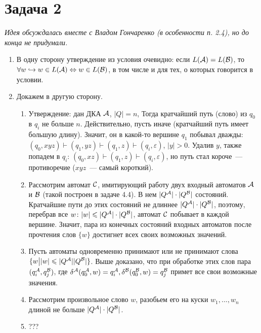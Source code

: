 \documentclass[a4paper]{article}
\def\A{{\cal A}}
\def\B{{\cal B}}
\def\C{{\cal C}}
\begin{document}
\section*{Задача 2}
{\em{Идея обсуждалась вместе с Владом Гончаренко (в особенности п. 2.4), но до конца не придумали.}}
\begin{enumerate}[1.]
\item В одну сторону утверждение из условия очевидно: если $L(\A)=L(\B)$, то $\forall w\hookrightarrow w\in L(\A)\Leftrightarrow w\in L(\B)$, в том числе и для тех, о которых говорится в условии.
\item Докажем в другую сторону.\begin{enumerate}[1.]
\item Утверждение: дан ДКА $\A$, $|Q|=n$, Тогда кратчайший путь (слово) из $q_0$ в $q_i$ не больше $n$. Действительно, пусть иначе (кратчайший путь имеет большую длину). Значит, он в какой-то вершине $q_1$ побывал дважды: $(q_0,xyz)\vdash(q_1,yz)\vdash(q_1,z)\vdash(q_i,\varepsilon)$, $|y|>0$. Удалив $y$, также попадем в $q_i$: $(q_0,xz)\vdash(q_1,z)\vdash(q_i,\varepsilon)$, но путь стал короче~--- противоречие ($xyz$~--- самый короткий).
\item Рассмотрим автомат $\C$, имитирующий работу двух входный автоматов $\A$ и $\B$ (такой построен в задаче 4.4). В нем $|Q^\A| \cdot |Q^\B|$ состояний. Кратчайшие пути до этих состояний не длиннее $|Q^\A| \cdot |Q^\B|$, поэтому, перебрав все $w\colon |w|\leqslant |Q^\A| \cdot |Q^\B|$, автомат $\C$ побывает в каждой вершине. Значит, пара из конечных состояний входных автоматов после прочтения слов $\{w\}$ достигнет всех своих возможных значений.
\item Пусть автоматы одновременно принимают или не принимают слова $\{w\big||w|\leqslant|Q^\A||Q^\B|\}$. Выше доказано, что при обработке этих слов пара $(q^\A_i,q^\B_j)$, где $\delta^\A(q^\A_0,w)=q^\A_i,\delta^\B(q^\B_0,w)=q^\B_j$ примет все свои возможные значения.
\item Рассмотрим произвольное слово $w$, разобьем его на куски $w_1,...,w_n$ длиной не больше $|Q^\A| \cdot |Q^\B|$.
\item ???
\end{enumerate}
\end{enumerate}
\newpage
\end{document}
